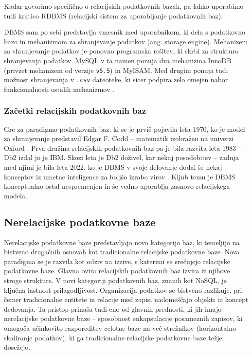 \documentclass[a4paper,12pt,openright]{book}
\begin{document}
        Kadar govorimo specifično o relacijskih podatkovnih bazah, pa lahko uporabimo tudi kratico RDBMS (relacijski sistem za uporabljanje podatkovnih baz).

        DBMS sam po sebi predstavlja vmesnik med uporabnikom, ki dela s podatkovno bazo in mehanizmom za shranjevanje podatkov (ang. storage engine). Mehanizem za shranjevanje podatkov je ponovno programska rešitev, ki skrbi za strukturo shranjevanja podatkov. MySQL v ta namen ponuja dva mehanizma InnoDB (privzet mehanizem od verzije {\tt v5.5}) in MyISAM. Med drugim ponuja tudi možnost shranjevanja v {\tt .csv} dateoteke, ki sicer podpira zelo omejen nabor funkcionalnosti ostalih mehanizmov \cite{MYSQL_SE}.

        \subsubsection{Začetki relacijskih podatkovnih baz}
        Gre za paradigmo podatkovnih baz, ki se je prvič pojavila leta 1970, ko je model za shranjevanje predstavil Edgar F. Codd – matematik izobražen na univerzi Oxford \cite{IBM_DBMS_1970}. Prva družina relacijskih podatkovnih baz pa je bila razvita leta 1983 – Db2 \cite{DB2} izdal jo je IBM. Skozi leta je Db2 doživel, kar nekaj posodobitev – zadnja med njimi je bila leta 2022, ko je DBMS v svoje delovanje dodal še nekaj konceptov iz umetne inteligence za boljšo izrabo virov \cite{DB213}. Kljub temu je DBMS konceptualno ostal nespremenjen in še vedno uporablja zasnovo relacijskega modela.
        
        \subsection{Nerelacijske podatkovne baze}
        Nerelacijske podatkovne baze predstavljajo novo kategorijo baz, ki temeljijo na bistveno drugačnih osnovah kot tradicionalne relacijske podatkovne baze. Nova paradigma se je razvila kot odziv na izzive, s katerimi se srečujejo relacijske podatkovne baze. Glavna ovira relacijskih podatkovnih baz izvira iz njihove stroge strukture. V novi kategoriji podatkovnih baz, znanih kot NoSQL, je ključna lastnost prilagodljivost. Organizacija podatkov se bistveno razlikuje, pri čemer tradicionalne entitete in relacije med zapisi nadomeščajo objekti in koncept dedovanja. Ta pristop prinaša tudi eno od glavnih prednosti, ki jih imajo nerelacijske podatkovne baze – sposobnost enkapsulacije posameznih zapisov, ki omogoča učinkovito razporeditev celotne baze na več strežnikov (horizontalno skaliranje podatkov), ki ga tradicionalne relacijske podatkovne baze težje dosežejo.
    
\end{document}
